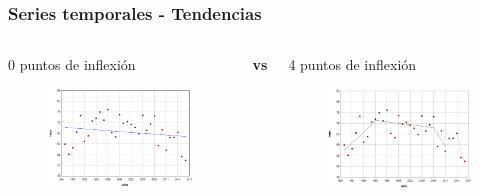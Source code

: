 \documentclass{beamer}
\begin{document}
\begin{frame}\frametitle{Series temporales - Tendencias}
	\begin{columns}
		\begin{column}{0.5\textwidth}
			\centering \normalsize 0 puntos de inflexión
			\begin{figure}
				\includegraphics[width=\textwidth]{images/jpo0.png}
			\end{figure}
			
		\end{column}
		\large{\textbf{vs}}
		\begin{column}{0.5\textwidth}
			\centering \normalsize 4 puntos de inflexión
			\begin{figure}
				\centering
				\includegraphics[width=\textwidth]{images/jpo4.png}
			\end{figure}
		\end{column}
	\end{columns}
\end{frame}
\end{document}
